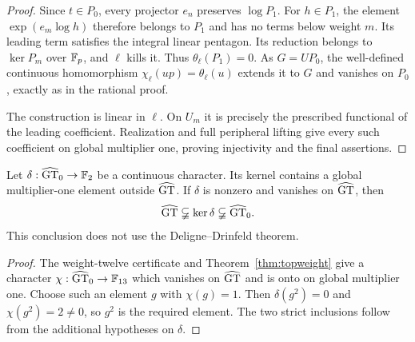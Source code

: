 \begin{proof}
Since $t\in P_0$, every projector $e_n$ preserves $\log P_1$.
For $h\in P_1$, the element
$\exp(e_m\log h)$ therefore belongs to $P_1$ and has no terms below
weight $m$.  Its leading term satisfies the integral linear pentagon.
Its reduction belongs to $\ker P_m$ over $\mathbb F_p$, and $\ell$ kills it.
Thus $\theta_\ell(P_1)=0$.  As $G=UP_0$, the well-defined continuous
homomorphism $\chi_\ell(up)=\theta_\ell(u)$ extends it to $G$ and
vanishes on $P_0$, exactly as in the rational proof.

The construction is linear in $\ell$.  On $U_m$ it is precisely the
prescribed functional of the leading coefficient.  Realization and
full peripheral lifting give every such coefficient on global
multiplier one, proving injectivity and the final assertions.
\end{proof}

\begin{corollary}
\label{cor:quadratic-kernel}
Let $\delta:\widehat{\mathrm{GT}}_0\to\mathbb F_2$ be a continuous character.  Its kernel
contains a global multiplier-one element outside $\widehat{\mathrm{GT}}$.  If $\delta$
is nonzero and vanishes on $\widehat{\mathrm{GT}}$, then
\[
 \widehat{\mathrm{GT}}\varsubsetneqq\ker\delta\varsubsetneqq\widehat{\mathrm{GT}}_0.
\]
This conclusion does not use the Deligne--Drinfeld theorem.
\end{corollary}
\begin{proof}
The weight-twelve certificate and Theorem~\ref{thm:topweight} give a
character $\chi:\widehat{\mathrm{GT}}_0\to\mathbb F_{13}$ which vanishes on $\widehat{\mathrm{GT}}$ and is onto
on global multiplier one.  Choose such an element $g$ with $\chi(g)=1$.
Then $\delta(g^2)=0$ and $\chi(g^2)=2\ne0$, so $g^2$ is the required
element.  The two strict inclusions follow from the additional hypotheses
on $\delta$.
\end{proof}
